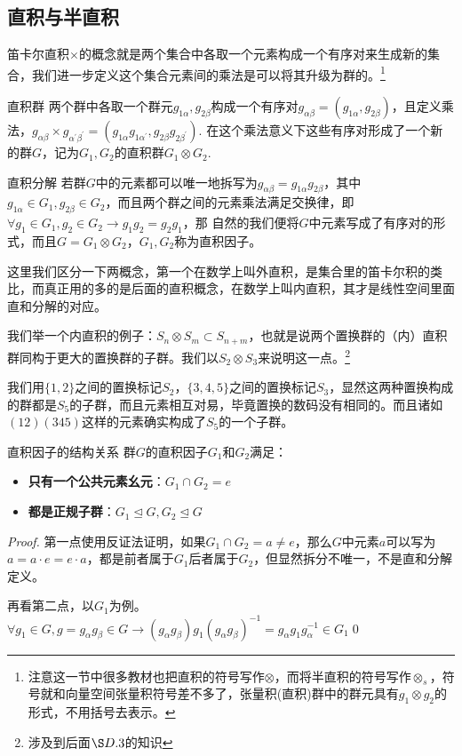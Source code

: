 \subsection{直积与半直积}
笛卡尔直积$\times$的概念就是两个集合中各取一个元素构成一个有序对来生成新的集合，我们进一步定义这个集合元素间的乘法是可以将其升级为群的。\footnote{注意这一节中很多教材也把直积的符号写作$\otimes$，而将半直积的符号写作$\otimes_s$，符号就和向量空间张量积符号差不多了，张量积(直积)群中的群元具有$g_1\otimes g_2$的形式，不用括号去表示。}
\begin{define}{直积群}
    两个群中各取一个群元$g_{1\alpha},g_{2\beta}$构成一个有序对$g_{\alpha\beta}=(g_{1\alpha},g_{2\beta})$，且定义乘法，$g_{\alpha\beta}\times g_{\alpha^\prime\beta^\prime}
    =(g_{1\alpha}g_{1\alpha^\prime},g_{2\beta}g_{2\beta^\prime})$. 在这个乘法意义下这些有序对形成了一个新的群$G$，记为$G_1,G_2$的直积群$G_1\otimes G_2$.
\end{define}
\begin{define}{直积分解}
    若群$G$中的元素都可以唯一地拆写为$g_{\alpha\beta}=g_{1\alpha}g_{2\beta}$，其中$g_{1\alpha}\in G_1,g_{2\beta}\in G_2$，而且两个群之间的元素乘法满足交换律，即$\forall g_1\in G_1,g_2\in G_2\rightarrow g_1g_2=g_2g_1$，那
    自然的我们便将$G$中元素写成了有序对的形式，而且$G=G_1\otimes G_2$，$G_1,G_2$称为直积因子。
\end{define}

这里我们区分一下两概念，第一个在数学上叫外直积，是集合里的笛卡尔积的类比，而真正用的多的是后面的直积概念，在数学上叫内直积，其才是线性空间里面直和分解的对应。

我们举一个内直积的例子：$S_n\otimes S_m \subset S_{n+m}$，也就是说两个置换群的（内）直积群同构于更大的置换群的子群。我们以$S_2\otimes S_3$来说明这一点。\footnote{涉及到后面$\S D.3$的知识}

我们用$\{1,2\}$之间的置换标记$S_2$，$\{3,4,5\}$之间的置换标记$S_3$，显然这两种置换构成的群都是$S_5$的子群，而且元素相互对易，毕竟置换的数码没有相同的。而且诸如$(12)(345)$这样的元素确实构成了$S_5$的一个子群。


\begin{theorem}{直积因子的结构关系}
    群$G$的直积因子$G_1$和$G_2$满足：
    \begin{itemize}
        \item \textbf{只有一个公共元素幺元}：$G_1\cap G_2={e}$
        \item \textbf{都是正规子群}：$G_1\unlhd G, G_2\unlhd G$
    \end{itemize}
\end{theorem}
\begin{proof}
    第一点使用反证法证明，如果$G_1\cap G_2=a\neq e$，那么$G$中元素$a$可以写为$a=a\cdot e=e\cdot a$，都是前者属于$G_1$后者属于$G_2$，但显然拆分不唯一，不是直和分解定义。

    再看第二点，以$G_1$为例。$\forall g_1\in G,g=g_\alpha g_\beta\in G\rightarrow (g_\alpha g_\beta)g_1(g_\alpha g_\beta)^{-1}=g_{\alpha} g_1 g_{\alpha}^{-1}\in G_1$\qed
\end{proof}

